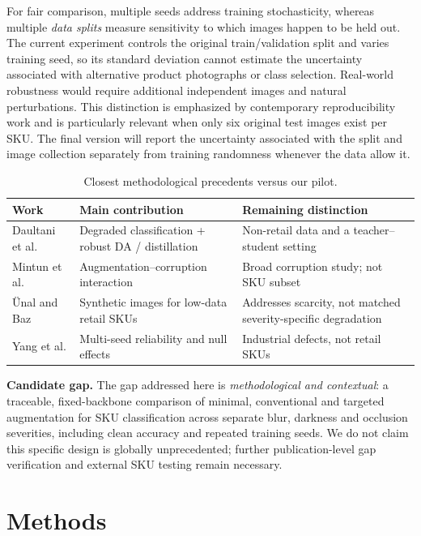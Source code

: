 \documentclass[sigconf,nonacm]{acmart}
\begin{document}
For fair comparison, multiple seeds address training stochasticity, whereas multiple \emph{data splits} measure sensitivity to which images happen to be held out. The current experiment controls the original train/validation split and varies training seed, so its standard deviation cannot estimate the uncertainty associated with alternative product photographs or class selection. Real-world robustness would require additional independent images and natural perturbations. This distinction is emphasized by contemporary reproducibility work and is particularly relevant when only six original test images exist per SKU. The final version will report the uncertainty associated with the split and image collection separately from training randomness whenever the data allow it.

\begin{table}[t]
\caption{Closest methodological precedents versus our pilot.}
\label{tab:related}
\small
\begin{tabular}{p{}p{}p{}}
\toprule
Work & Main contribution & Remaining distinction\\
\midrule
Daultani et al. \cite{daultani2024degraded} & Degraded classification + robust DA / distillation & Non-retail data and a teacher--student setting\\
Mintun et al. \cite{mintun2021interaction} & Augmentation--corruption interaction & Broad corruption study; not SKU subset\\
\"Unal and Baz \cite{unal2026synthetic} & Synthetic images for low-data retail SKUs & Addresses scarcity, not matched severity-specific degradation\\
Yang et al. \cite{yang2026repro} & Multi-seed reliability and null effects & Industrial defects, not retail SKUs\\
\bottomrule
\end{tabular}
\end{table}

\textbf{Candidate gap.} The gap addressed here is \emph{methodological and contextual}: a traceable, fixed-backbone comparison of minimal, conventional and targeted augmentation for SKU classification across separate blur, darkness and occlusion severities, including clean accuracy and repeated training seeds. We do not claim this specific design is globally unprecedented; further publication-level gap verification and external SKU testing remain necessary.

\section{Methods}
\end{document}
